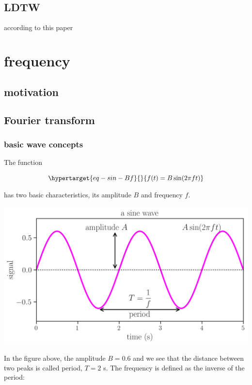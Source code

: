 \documentclass[
  letterpaper,
  DIV=11,
  numbers=noendperiod,
  oneside]{scrreprt}
\begin{document}
\hypertarget{ldtw}{%
\chapter{LDTW}\label{ldtw}}

according to this paper

\part{frequency}

\hypertarget{motivation-6}{%
\chapter{motivation}\label{motivation-6}}

\hypertarget{fourier-transform}{%
\chapter{Fourier transform}\label{fourier-transform}}

\hypertarget{basic-wave-concepts}{%
\section{basic wave concepts}\label{basic-wave-concepts}}

The function

\begin{equation}\protect\hypertarget{eq-sin-Bf}{}{
f(t) = B\sin(2\pi f t)
}\label{eq-sin-Bf}\end{equation}

has two basic characteristics, its amplitude \(B\) and frequency \(f\).

\includegraphics{frequency/sine1.png}

In the figure above, the amplitude \(B=0.6\) and we see that the
distance between two peaks is called period, \(T=2\) s. The frequency is
defined as the inverse of the period:
\end{document}
